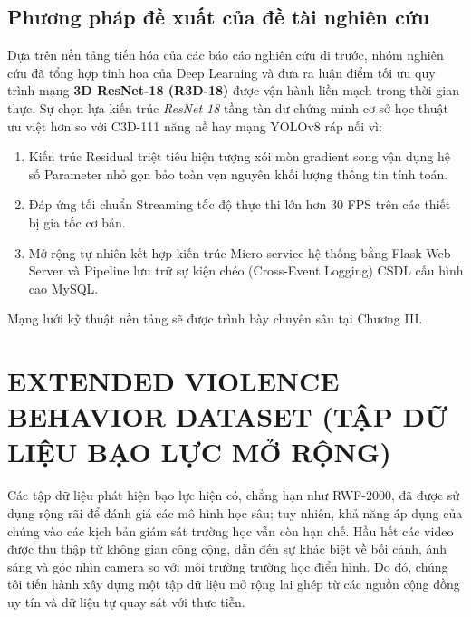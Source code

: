 \documentclass[conference]{IEEEtran}
\begin{document}
\subsection{Phương pháp đề xuất của đề tài nghiên cứu}
Dựa trên nền tảng tiến hóa của các báo cáo nghiên cứu đi trước, nhóm nghiên cứu đã tổng hợp tinh hoa của Deep Learning và đưa ra luận điểm tối ưu quy trình mạng \textbf{3D ResNet-18 (R3D-18)} được vận hành liền mạch trong thời gian thực.
Sự chọn lựa kiến trúc \textit{ResNet 18} tầng tàn dư chứng minh cơ sở học thuật ưu việt hơn so với C3D-111 năng nề hay mạng YOLOv8 ráp nối vì:
\begin{enumerate}
    \item Kiến trúc Residual triệt tiêu hiện tượng xói mòn gradient song vận dụng hệ số Parameter nhỏ gọn bảo toàn vẹn nguyên khối lượng thông tin tính toán.
    \item Đáp ứng tối chuẩn Streaming tốc độ thực thi lớn hơn 30 FPS trên các thiết bị gia tốc cơ bản.
    \item Mở rộng tự nhiên kết hợp kiến trúc Micro-service hệ thống bằng Flask Web Server và Pipeline lưu trữ sự kiện chéo (Cross-Event Logging) CSDL cấu hình cao MySQL.  
\end{enumerate}
Mạng lưới kỹ thuật nền tảng sẽ được trình bày chuyên sâu tại Chương III.


\section{EXTENDED VIOLENCE BEHAVIOR DATASET (TẬP DỮ LIỆU BẠO LỰC MỞ RỘNG)}

Các tập dữ liệu phát hiện bạo lực hiện có, chẳng hạn như RWF-2000, đã được sử dụng rộng rãi để đánh giá các mô hình học sâu; tuy nhiên, khả năng áp dụng của chúng vào các kịch bản giám sát trường học vẫn còn hạn chế. Hầu hết các video được thu thập từ không gian công cộng, dẫn đến sự khác biệt về bối cảnh, ánh sáng và góc nhìn camera so với môi trường trường học điển hình. Do đó, chúng tôi tiến hành xây dựng một tập dữ liệu mở rộng lai ghép từ các nguồn cộng đồng uy tín và dữ liệu tự quay sát với thực tiễn.
\end{document}
